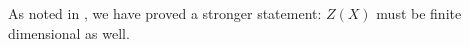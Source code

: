 \begin{rmk}
As noted in \cite{Corominas}, we have proved a stronger statement: $Z(X)$ must
be finite dimensional as well.
\end{rmk}

%
%

